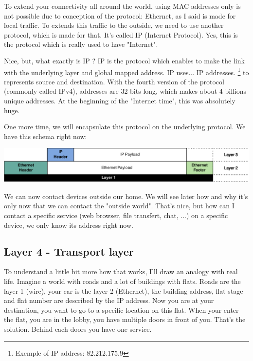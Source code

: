 \documentclass{article}
\begin{document}
	To extend your connectivity all around the world, using MAC addresses only is not possible due to conception
	of the protocol: Ethernet, as I said is made for local traffic. To extends this traffic to the outside, we need
	to use another protocol, which is made for that. It's called IP (Internet Protocol). Yes, this is the protocol
	which is really used to have "Internet".
	
	Nice, but, what exactly is IP ? IP is the protocol which enables to make the link with the underlying layer
	and global mapped address. IP uses... IP addresses.
	\footnote{Exemple of IP address: 82.212.175.9} to represents source and destination. With the fourth version of the protocol
	(commonly called IPv4), addresses are 32 bits long, which makes about 4 billions unique addresses. At the beginning of
	the "Internet time", this was absolutely huge.
	
	One more time, we will encapsulate this protocol on the underlying protocol. We have this schema right now:
	\begin{center}
	\includegraphics[scale=0.3]{content/layer3.eps}
	\end{center}
	
	We can now contact devices outside our home. We will see later how and why it's only now that we can contact
	the "outside world". That's nice, but how can I contact a specific service (web browser, file transfert, chat, ...)
	on a specific device, we only know its address right now.
	
	\subsection{Layer 4 - Transport layer}
	
	To understand a little bit more how that works, I'll draw an analogy with real life. Imagine a world with
	roads and a lot of buildings with flats. Roads are the layer 1 (wire), your car is the layer 2 (Ethernet), the building
	address, flat stage and flat number are described by the IP address. Now you are at your destination, you want to
	go to a specific location on this flat. When your enter the flat, you are in the lobby, you have multiple doors
	in front of you. That's the solution. Behind each doors you have one service.
	
\end{document}
